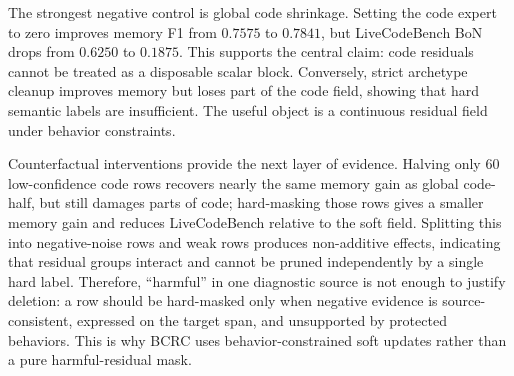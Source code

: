 \documentclass{article}
\newcommand{\bcrc}{\textsc{BCRC}\xspace}
\newcommand{\rcfbc}{\textsc{RCF-BC}\xspace}
\begin{document}
\begin{table}[t]
\centering
\scriptsize
{}
\caption{Mechanism evidence.  Hard behavior constraints protect memory but suppress code; global code shrinkage improves memory but damages code; local hard masking is more targeted but still loses source-specific code signal.  \rcfbc keeps a continuous field and exposes the trade-off instead of collapsing it into one expert scalar.}
\label{tab:main-evidence}
\end{table}

The strongest negative control is global code shrinkage.  Setting the code expert to zero improves memory F1 from $0.7575$ to $0.7841$, but LiveCodeBench BoN drops from $0.6250$ to $0.1875$.  This supports the central claim: code residuals cannot be treated as a disposable scalar block.  Conversely, strict archetype cleanup improves memory but loses part of the code field, showing that hard semantic labels are insufficient.  The useful object is a continuous residual field under behavior constraints.

Counterfactual interventions provide the next layer of evidence.  Halving only $60$ low-confidence code rows recovers nearly the same memory gain as global code-half, but still damages parts of code; hard-masking those rows gives a smaller memory gain and reduces LiveCodeBench relative to the soft field.  Splitting this into negative-noise rows and weak rows produces non-additive effects, indicating that residual groups interact and cannot be pruned independently by a single hard label.  Therefore, ``harmful'' in one diagnostic source is not enough to justify deletion: a row should be hard-masked only when negative evidence is source-consistent, expressed on the target span, and unsupported by protected behaviors.  This is why \bcrc uses behavior-constrained soft updates rather than a pure harmful-residual mask.
\end{document}
